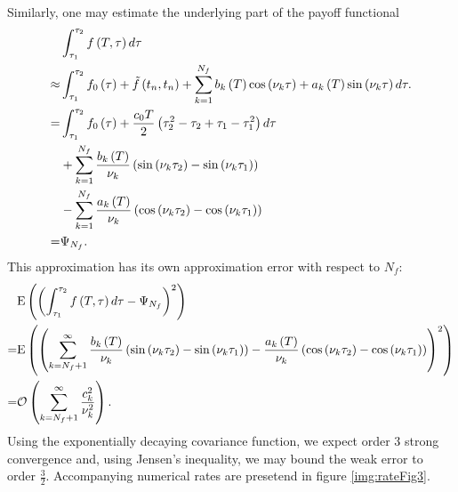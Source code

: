 \documentclass[11pt]{amsart}
\begin{document}
Similarly, one may estimate the underlying part of the 
payoff functional
\begin{align*}
&\int_{\tau_1}^{\tau_2}
f \left( {T,\tau} \right) d\tau 
\\
\approx & \int_{\tau_1}^{\tau_2}
f_0 \left( {\tau} \right) + \tilde f \left( {t_n, t_n} \right) +
\displaystyle\sum\limits_{k=1}^{N_f}
b_k \left( {T} \right) \cos \left( {\nu_{k} \tau} \right) + a_k \left( {T} \right) \sin \left( {\nu_{k} \tau} \right)
d \tau.
\\
= & \int_{\tau_1}^{\tau_2}
f_0 \left( {\tau} \right)  + \frac{c_0 T}{2} \left( {\tau_2^2 - \tau_2 +\tau_1 - \tau_1^2} \right) d \tau
\\
&+
\displaystyle\sum\limits_{k=1}^{N_f} 
\frac{b_k \left( {T} \right)}{\nu_{k} } 
\left( {\sin \left( {\nu_{k} \tau_2} \right)  - \sin \left( {\nu_{k} \tau_1} \right) } \right)
\\
&-
\displaystyle\sum\limits_{k=1}^{N_f} 
\frac{a_k \left( {T} \right)}{\nu_{k}} 
\left( {\cos \left( {\nu_{k} \tau_2} \right)  - \cos \left( {\nu_{k} \tau_1} \right) } \right)
\\
=& \Psi_{N_f} .
\end{align*}
This approximation has its own approximation error with respect to $N_f$:
\begin{align*}
&\mathrm{E} \left( {{\left( {\int_{\tau_1}^{\tau_2} f \left( {T,\tau} \right) d \tau - \Psi_{N_f}} \right)^2}} \right)
\\
=& \mathrm{E} \left( {{\left( {\displaystyle\sum\limits_{k=N_f+1}^{\infty} \frac{b_k \left( {T} \right)}{\nu_{k} } 
\left( {\sin \left( {\nu_{k} \tau_2} \right)  - \sin \left( {\nu_{k} \tau_1} \right) } \right) - \frac{a_k \left( {T} \right)}{\nu_{k}} 
\left( {\cos \left( {\nu_{k} \tau_2} \right)  - \cos \left( {\nu_{k} \tau_1} \right) } \right)  } \right)^2}} \right)
\\
= & \mathcal O \left( {{\displaystyle\sum\limits_{k = N_f+1}^{\infty} \frac{c_k^2}{\nu_{k}^2}}} \right).
\end{align*}
Using the exponentially decaying covariance function, we expect order $3$ strong convergence
and, using Jensen's inequality, we may bound the weak error to order $\frac{3}{2}$. Accompanying numerical rates are presetend in figure \ref{img:rateFig3}.
\end{document}
